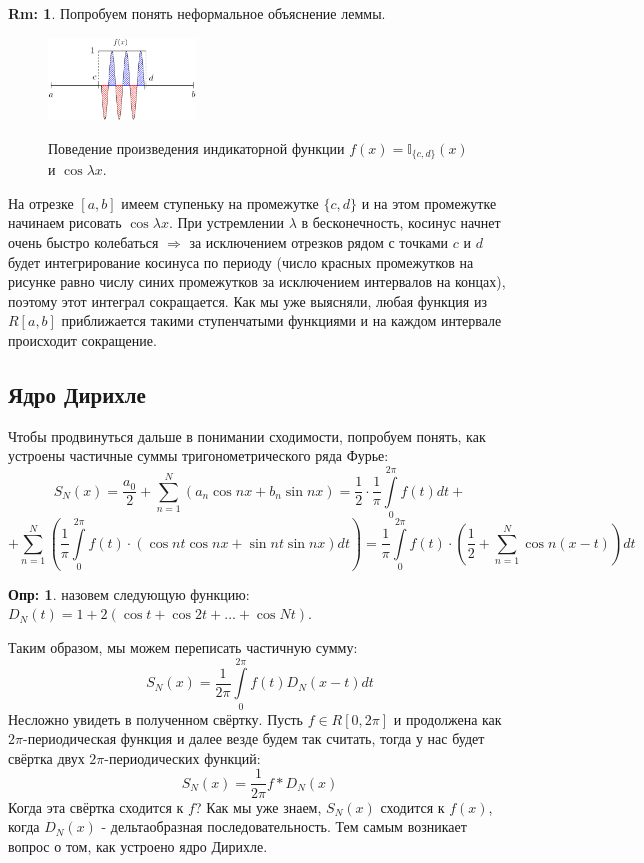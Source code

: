 \documentclass[12pt]{article}
\newcommand{\MTI}{\mathbb{I}}
\theoremstyle{definition}
\newtheorem{defn}{Опр:}
\newtheorem{rem}{Rm:}
\newcommand{\ddsum}[2]{\displaystyle\sum\limits_{#1}^{#2}}
\newcommand{\ddint}[2]{\displaystyle\int\limits_{#1}^{#2}}
\begin{document}
\begin{rem}
	Попробуем понять неформальное объяснение леммы. 
	\begin{figure}[H]
		\centering
		\includegraphics[width=0.35\textwidth]{MA3L28_1.png}
		\label{MA3L28_1}
		\caption{Поведение произведения индикаторной функции $f(x) =\MTI_{\{c,d\}}(x)$ и $\cos{\lambda x}$.}
		\label{fig: Построение функции}
	\end{figure}
	На отрезке $[a,b]$ имеем ступеньку на промежутке $\{c,d\}$ и на этом промежутке начинаем рисовать $\cos{\lambda x}$. При устремлении $\lambda$ в бесконечность, косинус начнет очень быстро колебаться $\Rightarrow$ за исключением отрезков рядом с точками $c$ и $d$ будет интегрирование косинуса по периоду (число красных промежутков на рисунке равно числу синих промежутков за исключением интервалов на концах), поэтому этот интеграл сокращается. Как мы уже выясняли, любая функция из $R[a,b]$ приближается такими ступенчатыми функциями и на каждом интервале происходит сокращение. 
\end{rem}

\newpage
\subsection*{Ядро Дирихле}
Чтобы продвинуться дальше в понимании сходимости, попробуем понять, как устроены частичные суммы тригонометрического ряда Фурье:
$$
	S_N(x) =\dfrac{a_0}{2} + \ddsum{n = 1}{N}\left(a_n \cos{nx} + b_n \sin{nx}\right) =
\dfrac{1}{2}{\cdot}\dfrac{1}{\pi}\ddint{0}{2\pi}f(t)dt + 
$$
$$
	+ \ddsum{n = 1}{N}\left(\dfrac{1}{\pi}\ddint{0}{2\pi}f(t){\cdot}\left(\cos{nt}\cos{nx} + \sin{nt}\sin{nx}\right)dt\right) 
	=	\dfrac{1}{\pi}\ddint{0}{2\pi}f(t){\cdot}\left(\dfrac{1}{2} + \ddsum{n = 1}{N}\cos{n(x-t)}\right)dt
$$
\begin{defn}
	 назовем следующую функцию: $D_N(t) = 1 + 2\left(\cos{t} + \cos{2t} + \dotsc + \cos{Nt}\right)$.
\end{defn}
Таким образом, мы можем переписать частичную сумму:
$$
	S_N(x) = \dfrac{1}{2\pi}\ddint{0}{2\pi}f(t)D_N(x -t)dt
$$
Несложно увидеть в полученном свёртку. Пусть $f \in R[0,2\pi]$ и продолжена как $2\pi$-периодическая функция и далее везде будем так считать, тогда у нас будет свёртка двух $2\pi$-периодических функций:
$$
	S_N(x) = \dfrac{1}{2\pi}f*D_N(x)
$$
Когда эта свёртка сходится к $f$? Как мы уже знаем, $S_N(x)$ сходится к $f(x)$, когда $D_N(x)$ - дельтаобразная последовательность. Тем самым возникает вопрос о том, как устроено ядро Дирихле.
\end{document}
